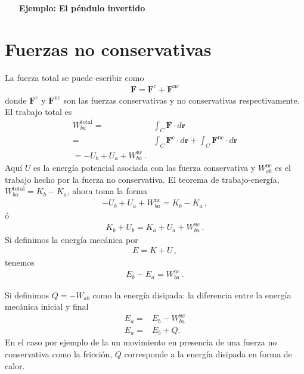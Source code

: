 \begin{inprogress}
  \begin{itemize}
  \item[\textbf{Ejemplo:}] \textbf{El péndulo invertido}
  \end{itemize}
\end{inprogress}


\section{Fuerzas no conservativas}
La fuerza total se puede escribir como
\begin{align}
  \mathbf{F}=\mathbf{F}^{\text{c}}+\mathbf{F}^{\text{nc}}
\end{align}
donde $\mathbf{F}^{\text{c}}$ y $\mathbf{F}^{\text{nc}}$ son las fuerzas conservativas y no conservativas respectivamente. El trabajo total es
\begin{align}
  W_{ba}^{\text{total}}=&\int_C \mathbf{F}\cdot d\mathbf{r}\nonumber\\
=&\int_C \mathbf{F}^{\text{c}}\cdot d\mathbf{r}+\int_C \mathbf{F}^{\text{nc}}\cdot d\mathbf{r}\nonumber\\
=-U_b+U_a+W_{ba}^{\text{nc}}\,.
\end{align}
Aquí $U$ es la energía potencial asociada con las fuerza conservativa y $W_{ab}^{\text{nc}}$ es el trabajo hecho por la fuerza no conservativa. El teorema de trabajo-energía, $W_{ba}^{\text{total}}=K_b-K_a$, ahora toma la forma
\begin{align}
  -U_b+U_a+W_{ba}^{\text{nc}}=K_b-K_a\,,
\end{align}
ó
\begin{align}
  K_b+U_b=K_a+U_a+W_{ba}^{\text{nc}}\,.
\end{align}
Si definimos la energía mecánica por
\begin{align}
  E=K+U\,,
\end{align}
tenemos
\begin{align}
  E_b-E_a=W_{ba}^{\text{nc}}\,.
\end{align}

Si definimos $Q=-W_{ab}$ como la energía disipada: la diferencia entre
la energía mecánica inicial y final
\begin{align}
  E_a=&E_b-W_{ba}^{\text{nc}}\nonumber\\
   E_a=&E_b+Q.
\end{align}
En el caso por ejemplo de la un movimiento en presencia de una fuerza
no conservativa como la fricción, $Q$ corresponde a la energía
disipada en forma de calor.

